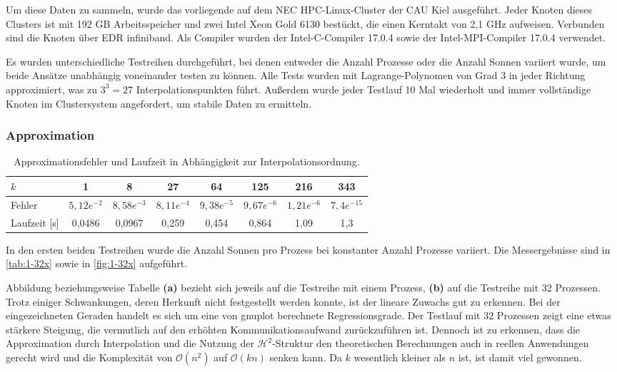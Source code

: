   Um diese Daten zu sammeln, wurde das vorliegende auf dem NEC HPC-Linux-Cluster der CAU Kiel ausgeführt. Jeder Knoten dieses Clusters ist mit 192 GB Arbeitsspeicher und zwei Intel Xeon Gold 
  6130 bestückt, die einen Kerntakt von 2,1 GHz aufweisen. Verbunden sind die Knoten über EDR infiniband. Als Compiler wurden der Intel-C-Compiler 17.0.4 sowie der Intel-MPI-Compiler 17.0.4 verwendet.
  
  Es wurden unterschiedliche Testreihen durchgeführt, bei denen entweder die Anzahl Prozesse oder die Anzahl Sonnen variiert wurde, um beide Ansätze unabhängig voneinander testen zu können.
  Alle Tests wurden mit Lagrange-Polynomen von Grad $3$ in jeder Richtung approximiert, was zu $3^3 = 27$ Interpolationspunkten führt. Außerdem wurde jeder Testlauf 10 Mal wiederholt und immer 
  vollständige Knoten im Clustersystem angefordert, um stabile Daten zu ermitteln.
  
  \subsubsection{Approximation}
  
  
  \begin{table}[b]
    \begin{tabular}{|l|c c c c c c c|}
    \hline
    $k$ & 1 & 8 & 27 & 64 & 125 & 216 & 343\\
    \hline
    Fehler & $5,12e^{-2}$ & $8,58e^{-3}$ & $8,11e^{-4}$ & $9,38e^{-5}$ & $9,67e^{-6}$ & $1,21e^{-6}$ & $7,4e^{-15}$\\
    \hline
    Laufzeit [s] & 0,0486 & 0,0967 & 0,259 & 0,454 & 0,864 & 1,09 & 1,3\\
    \hline
    \end{tabular}
    \caption{Approximationsfehler und Laufzeit in Abhängigkeit zur Interpolationsordnung.}
    \label{tab:error}
  \end{table}
  
  In den ersten beiden Testreihen wurde die Anzahl Sonnen pro Prozess bei konstanter Anzahl Prozesse variiert. Die Messergebnisse sind in \autoref{tab:1-32x} sowie in \autoref{fig:1-32x} 
  aufgeführt.
  
  Abbildung beziehungsweise Tabelle \textbf{(a)} bezieht sich jeweils auf die Testreihe mit einem Prozess, \textbf{(b)} auf die Testreihe mit 32 Prozessen. Trotz einiger Schwankungen, deren Herkunft
  nicht festgestellt werden konnte, ist der lineare Zuwachs gut zu erkennen. Bei der eingezeichneten Geraden handelt es sich um eine von gnuplot berechnete Regressionsgrade. Der Testlauf mit $32$ 
  Prozessen zeigt eine etwas stärkere Steigung, die vermutlich auf den erhöhten Kommunikationsaufwand zurückzuführen ist. Dennoch ist zu erkennen, dass die Approximation durch Interpolation und die 
  Nutzung der $\mathcal{H}^2$-Struktur den theoretischen Berechnungen auch in reellen Anwendungen gerecht wird und die Komplexität von $\mathcal{O}(n^2)$ auf $\mathcal{O}(k n)$ senken kann. Da $k$ 
  wesentlich kleiner als $n$ ist, ist damit viel gewonnen.
  
